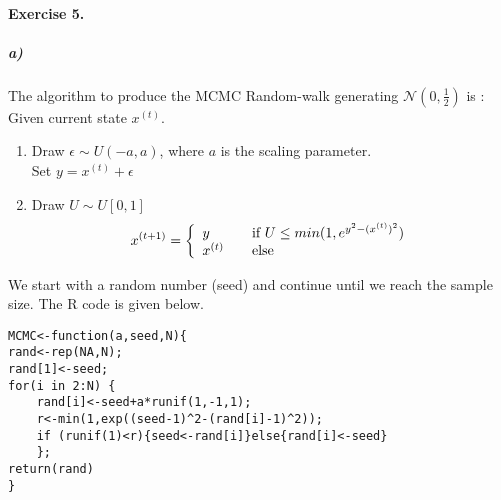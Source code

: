 \documentclass{article}
\begin{document}
\paragraph{Exercise 5.\\}
\subparagraph{a)}
The algorithm to produce the MCMC Random-walk generating $\mathcal{N}(0,\frac{1}{2})$ is : \\
Given current state $x^{(t)}$.
\begin{enumerate}
\item Draw $\epsilon \sim U(-a,a)$, where $a$ is the scaling parameter.\\
Set $y=x^{(t)}+\epsilon$
\item Draw $U \sim U[0,1]$\\
$$x^{(t+1)} = \left\{ 
\begin{array}{l l}
  y & \quad \text{if $U \leq min(1,e^{y^2-(x^{(t)})^2})$}\\
  x^{(t)} & \quad \text{else}\\ \end{array} \right.
$$
\end{enumerate}
We start with a random number (seed) and continue until we reach the sample size. The R code is given below.
\begin{verbatim}
MCMC<-function(a,seed,N){
rand<-rep(NA,N);
rand[1]<-seed;
for(i in 2:N) {
	rand[i]<-seed+a*runif(1,-1,1);
	r<-min(1,exp((seed-1)^2-(rand[i]-1)^2));
	if (runif(1)<r){seed<-rand[i]}else{rand[i]<-seed}
	};
return(rand)
}
\end{verbatim}
\end{document}
